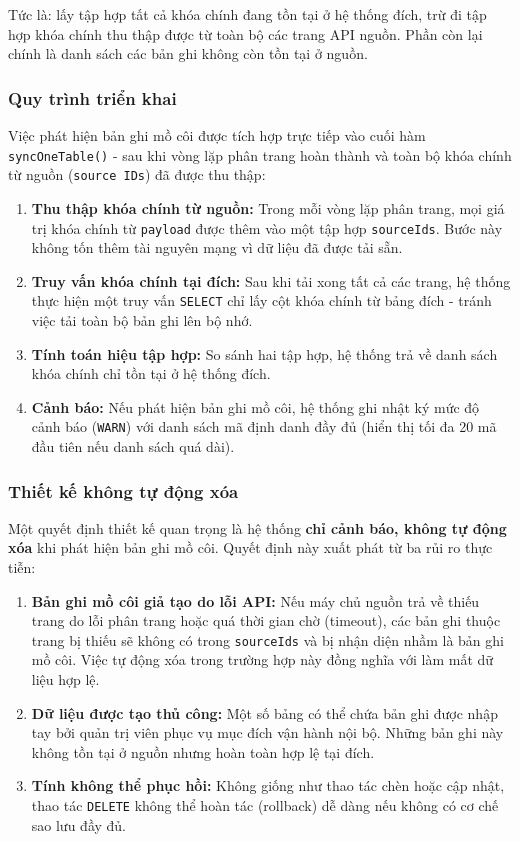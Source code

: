 Tức là: lấy tập hợp tất cả khóa chính đang tồn tại ở hệ thống đích, trừ đi tập hợp khóa chính thu thập được từ toàn bộ các trang API nguồn. Phần còn lại chính là danh sách các bản ghi không còn tồn tại ở nguồn.

\subsubsection{Quy trình triển khai}

Việc phát hiện bản ghi mồ côi được tích hợp trực tiếp vào cuối hàm \texttt{syncOneTable()} - sau khi vòng lặp phân trang hoàn thành và toàn bộ khóa chính từ nguồn (\texttt{source IDs}) đã được thu thập:

\begin{enumerate}
    \item \textbf{Thu thập khóa chính từ nguồn:} Trong mỗi vòng lặp phân trang, mọi giá trị khóa chính từ \texttt{payload} được thêm vào một tập hợp \texttt{sourceIds}. Bước này không tốn thêm tài nguyên mạng vì dữ liệu đã được tải sẵn.
    \item \textbf{Truy vấn khóa chính tại đích:} Sau khi tải xong tất cả các trang, hệ thống thực hiện một truy vấn \texttt{SELECT} chỉ lấy cột khóa chính từ bảng đích - tránh việc tải toàn bộ bản ghi lên bộ nhớ.
    \item \textbf{Tính toán hiệu tập hợp:} So sánh hai tập hợp, hệ thống trả về danh sách khóa chính chỉ tồn tại ở hệ thống đích.
    \item \textbf{Cảnh báo:} Nếu phát hiện bản ghi mồ côi, hệ thống ghi nhật ký mức độ cảnh báo (\texttt{WARN}) với danh sách mã định danh đầy đủ (hiển thị tối đa 20 mã đầu tiên nếu danh sách quá dài).
\end{enumerate}

\subsubsection{Thiết kế không tự động xóa}

Một quyết định thiết kế quan trọng là hệ thống \textbf{chỉ cảnh báo, không tự động xóa} khi phát hiện bản ghi mồ côi. Quyết định này xuất phát từ ba rủi ro thực tiễn:

\begin{enumerate}
    \item \textbf{Bản ghi mồ côi giả tạo do lỗi API:} Nếu máy chủ nguồn trả về thiếu trang do lỗi phân trang hoặc quá thời gian chờ (timeout), các bản ghi thuộc trang bị thiếu sẽ không có trong \texttt{sourceIds} và bị nhận diện nhầm là bản ghi mồ côi. Việc tự động xóa trong trường hợp này đồng nghĩa với làm mất dữ liệu hợp lệ.
    \item \textbf{Dữ liệu được tạo thủ công:} Một số bảng có thể chứa bản ghi được nhập tay bởi quản trị viên phục vụ mục đích vận hành nội bộ. Những bản ghi này không tồn tại ở nguồn nhưng hoàn toàn hợp lệ tại đích.
    \item \textbf{Tính không thể phục hồi:} Không giống như thao tác chèn hoặc cập nhật, thao tác \texttt{DELETE} không thể hoàn tác (rollback) dễ dàng nếu không có cơ chế sao lưu đầy đủ.
\end{enumerate}

